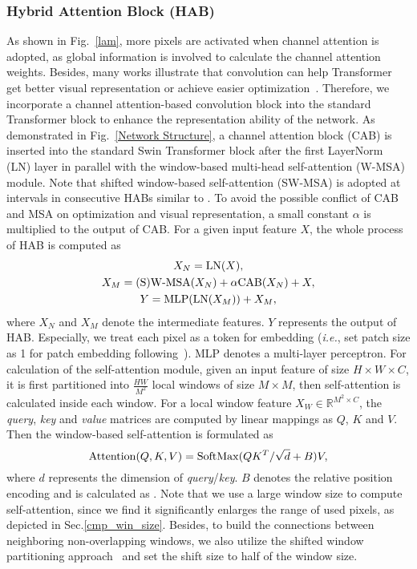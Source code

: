 \documentclass[10pt,twocolumn,letterpaper]{article}
\begin{document}
\subsubsection{Hybrid Attention Block (HAB)} 
\label{HAB}
As shown in Fig.~\ref{lam}, more pixels are activated when channel attention is adopted, as global information is involved to calculate the channel attention weights. Besides, many works illustrate that convolution can help Transformer get better visual representation or achieve easier optimization~\cite{cvt,vitc,ceit,uniformer,spach}. Therefore, we incorporate a channel attention-based convolution block into the standard Transformer block to enhance the representation ability of the network. As demonstrated in Fig.~\ref{Network Structure}, a channel attention block (CAB) is inserted into the standard Swin Transformer block after the first LayerNorm (LN) layer in parallel with the window-based multi-head self-attention (W-MSA) module. Note that shifted window-based self-attention (SW-MSA) is adopted at intervals in consecutive HABs similar to \cite{swin_t,swinir}. 
To avoid the possible conflict of CAB and MSA on optimization and visual representation, a small constant $\alpha$ is multiplied to the output of CAB. For a given input feature $X$, the whole process of HAB is computed as 
\begin{gather}
  X_N={\rm LN}(X), \notag \\
  X_M={\rm \text{(S)W-MSA}}(X_N)+\alpha {\rm CAB} (X_N)+X, \\
  Y={\rm MLP}({\rm LN}(X_M))+X_M, \notag 
\end{gather}
where $X_N$ and $X_M$ denote the intermediate features. $Y$ represents the output of HAB. 
Especially, we treat each pixel as a token for embedding (\textit{i.e.}, set patch size as 1 for patch embedding following~\cite{swinir}). MLP denotes a multi-layer perceptron. For  calculation of the self-attention module, given an input feature of size $H\times W\times C$, it is first partitioned into $\frac{HW}{M^2}$ local windows of size $M\times M$, then self-attention is calculated inside each window. For a local window feature $X_W\in\mathbb{R}^{M^2\times C}$, the \textit{query}, \textit{key} and \textit{value} matrices are computed by linear mappings as $Q$, $K$ and $V$. Then the window-based self-attention is formulated as 
\begin{equation}
    {\rm Attention}(Q,K,V)={\rm SoftMax}(QK^T/\sqrt{d}+B)V, \label{attn}
\end{equation}
where $d$ represents the dimension of \textit{query}/\textit{key}. $B$ denotes the relative position encoding and is calculated as \cite{transformer}. Note that we use a large window size to compute self-attention, since we find it significantly enlarges the range of used pixels, as depicted in Sec.\ref{cmp_win_size}. Besides, to build the connections between neighboring non-overlapping windows, we also utilize the shifted window partitioning approach~\cite{swin_t} and set the shift size to half of the window size. 
\end{document}
